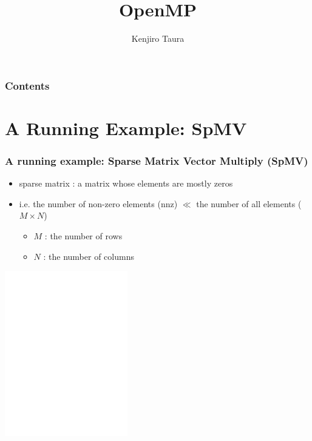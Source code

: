 \documentclass[12pt,dvipdfmx]{beamer}
\title{OpenMP}
\institute{}
\author{Kenjiro Taura}
\date{}
\newcommand{\ao}[1]{{\color{blue}#1}}
\begin{document}
\maketitle

\begin{frame}
\frametitle{Contents}
\tableofcontents
\end{frame}

\section{A Running Example: SpMV}
\begin{frame}
  \frametitle{A running example: Sparse Matrix Vector Multiply (SpMV)}
  \begin{itemize}
  \item \ao{sparse matrix} : a matrix whose elements are mostly zeros
  \item i.e. the number of non-zero elements (\ao{nnz}) $\ll$ the number of all elements (\ao{$M \times N$})
    \begin{itemize}
    \item $M$ : the number of rows
    \item $N$ : the number of columns
    \end{itemize}
  \end{itemize}

  \begin{center}
  \includegraphics[width=0.4\textwidth]{out/pdf/svg/spmv.pdf}
  \end{center}
\end{frame}
\end{document}
